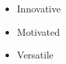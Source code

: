 %
%
%

\twocolumnsection
{
\begin{skills}
\end{skills}}
{
\vspace{1em}
\begin{itemize}
	\item Innovative
	\item Motivated                    
    \item Versatile
\end{itemize}
}
